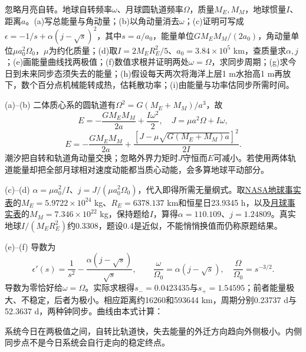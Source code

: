 \begin{exercise}
忽略月亮自转。地球自转频率$\omega$、月球圆轨道频率$\Omega$，质量$M_E,M_M$，地球惯量$I$、距离$a$。(a)写总能量与角动量；(b)以角动量消去$\omega$；(c)证明可写成$\epsilon=-1/s+\alpha(j-\sqrt s)^2$，其中$s=a/a_0$，能量单位$GM_EM_M/(2a_0)$，角动量单位$\mu a_0^2\Omega_0$，$\mu$为约化质量；(d)取$I=2M_ER_E^2/5$、$a_0=3.84\times10^5$ km，查质量求$\alpha,j$；(e)画能量曲线找两极值；(f)数值求根并证明两处$\omega=\Omega$，求同步周期；(g)求今日到未来同步态须失去的能量；(h)假设每天两次将海洋上层1 m水抬高1 m再放下，数个百分点机械能转成热，估耗散功率；(i)由能量与功率估同步所需时间。
\end{exercise}
\begin{solution}
(a)--(b) 二体质心系的圆轨道有$\Omega^2=G(M_E+M_M)/a^3$，故
\[
 E=-\frac{GM_EM_M}{2a}+\frac{I\omega^2}{2},\quad
 J=\mu a^2\Omega+I\omega,
\]
\[
 E=-\frac{GM_EM_M}{2a}
 +\frac{[J-\mu\sqrt{G(M_E+M_M)a}]^2}{2I}.
\]
潮汐把自转和轨道角动量交换；忽略外界力矩时$J$守恒而$E$可减小。若使用两体轨道能量却把全部月球相对速度动能都当质心动能，会多算地球平动部分。

(c)--(d) $\alpha=\mu a_0^2/I$、$j=J/(\mu a_0^2\Omega_0)$，代入即得所需无量纲式。取\href{https://nssdc.gsfc.nasa.gov/planetary/factsheet/earthfact.html}{NASA地球事实表}的$M_E=5.9722\times10^{24}$ kg、$R_E=6378.137$ km和恒星日23.9345 h，以及\href{https://nssdc.gsfc.nasa.gov/planetary/factsheet/moonfact.html}{月球事实表}的$M_M=7.346\times10^{22}$ kg，保持题给$I$，算得$\alpha=110.109$、$j=1.24809$。真实地球$I/(M_ER_E^2)$约0.3308，题设0.4是近似，不能悄悄换值而仍称原题结果。

(e)--(f) 导数为
\[
 \epsilon'(s)=\frac1{s^2}-\frac{\alpha(j-\sqrt s)}{\sqrt s},\qquad
 \frac\omega{\Omega_0}=\alpha(j-\sqrt s),\quad
 \frac\Omega{\Omega_0}=s^{-3/2}.
\]
导数为零恰好给$\omega=\Omega$。实际求根得$s_-=0.0423435$与$s_+=1.54595$；前者能量极大、不稳定，后者为极小。相应距离约16260和593644 km，周期分别0.23737 d与52.3637 d，两种钟同步。曲线由本式计算：
\begin{center}\end{center}
系统今日在两极值之间，自转比轨道快，失去能量的外迁方向趋向外侧极小。内侧同步点不是今日系统会自行走向的稳定终点。


\end{solution}
